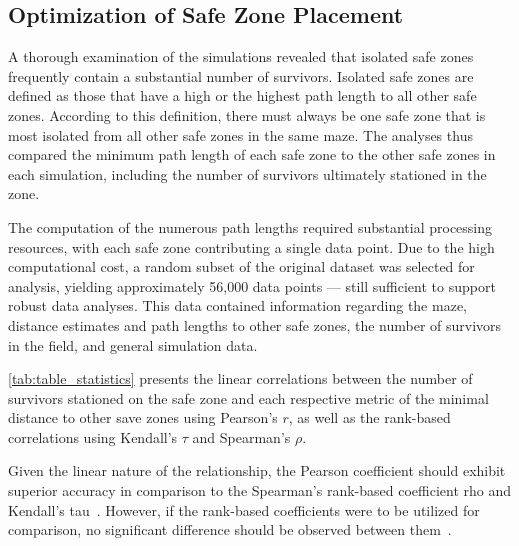 \documentclass[3p,times,procedia]{elsarticle}
\begin{document}
\subsection{Optimization of Safe Zone Placement}
\label{subsec:safe_zone_placement}

A thorough examination of the simulations revealed that isolated safe zones frequently contain a substantial number of survivors.
Isolated safe zones are defined as those that have a high or the highest path length to all other safe zones.
According to this definition, there must always be one safe zone that is most isolated from all other safe zones in the same maze.
The analyses thus compared the minimum path length of each safe zone to the other safe zones in each simulation, including the number of survivors ultimately stationed in the zone.

The computation of the numerous path lengths required substantial processing resources, with each safe zone contributing a single data point. Due to the high computational cost, a random subset of the original dataset was selected for analysis, yielding approximately 56,000 data points — still sufficient to support robust data analyses.
This data contained information regarding the maze, distance estimates and path lengths to other safe zones, the number of survivors in the field, and general simulation data.


\autoref{tab:table_statistics} presents the linear correlations between the number of survivors stationed on the safe zone and each respective metric of the minimal distance to other save zones using Pearson’s $r$, as well as the rank-based correlations using Kendall’s $\tau$ and Spearman’s $\rho$.

Given the linear nature of the relationship, the Pearson coefficient should exhibit superior accuracy in comparison to the Spearman's rank-based coefficient rho and Kendall's tau\ \cite{hauke2011comparison}.
However, if the rank-based coefficients were to be utilized for comparison, no significant difference should be observed between them\ \cite{puth2015effective}.
\end{document}
